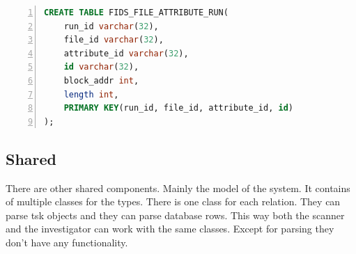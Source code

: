 \begin{lstlisting}[language=sql, numbers=left, caption=Fids File Attribute Run Table Definition, label=lst:cfg:fids:file:attr:run]
CREATE TABLE FIDS_FILE_ATTRIBUTE_RUN(
	run_id varchar(32),
	file_id varchar(32),
	attribute_id varchar(32), 
	id varchar(32), 
	block_addr int, 
	length int, 
	PRIMARY KEY(run_id, file_id, attribute_id, id) 
);
\end{lstlisting}

\subsection{Shared}

There are other shared components. Mainly the model of the system. It contains of multiple classes for the types. There is one class for each relation. They can parse \gls{tsk} objects and they can parse database rows. This way both the scanner and the investigator can work with the same classes. Except for parsing they don't have any functionality.

